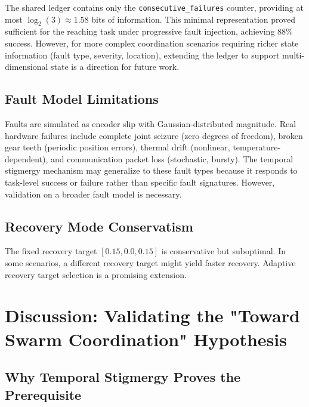\documentclass[12pt,a4paper,oneside]{report}
\begin{document}
The shared ledger contains only the \texttt{consecutive\_failures} counter, providing at most $\log_2(3) \approx 1.58$ bits of information. This minimal representation proved sufficient for the reaching task under progressive fault injection, achieving 88\% success. However, for more complex coordination scenarios requiring richer state information (fault type, severity, location), extending the ledger to support multi-dimensional state is a direction for future work.

\subsection{Fault Model Limitations}
\label{subsec:fault_model_limitations}

Faults are simulated as encoder slip with Gaussian-distributed magnitude. Real hardware failures include complete joint seizure (zero degrees of freedom), broken gear teeth (periodic position errors), thermal drift (nonlinear, temperature-dependent), and communication packet loss (stochastic, bursty). The temporal stigmergy mechanism may generalize to these fault types because it responds to task-level success or failure rather than specific fault signatures. However, validation on a broader fault model is necessary.

\subsection{Recovery Mode Conservatism}
\label{subsec:recovery_mode_conservatism}

The fixed recovery target $[0.15, 0.0, 0.15]$ is conservative but suboptimal. In some scenarios, a different recovery target might yield faster recovery. Adaptive recovery target selection is a promising extension.

\section{Discussion: Validating the "Toward Swarm Coordination" Hypothesis}

\subsection{Why Temporal Stigmergy Proves the Prerequisite}
\label{subsec:why_temporal_stigmergy_proves_the_prerequisite_1}
\end{document}
